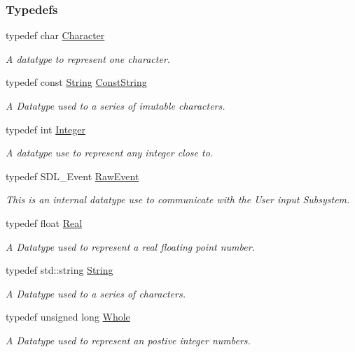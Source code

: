 \subsubsection*{Typedefs}
\begin{DoxyCompactItemize}
\item 
typedef char \hyperlink{namespacephys_a3098bae5b0a3cd16eec331f766cc562b}{Character}
\begin{DoxyCompactList}\small\item\em A datatype to represent one character. \item\end{DoxyCompactList}\item 
typedef const \hyperlink{namespacephys_aa03900411993de7fbfec4789bc1d392e}{String} \hyperlink{namespacephys_a5ce5049f8b4bf88d6413c47b504ebb31}{ConstString}
\begin{DoxyCompactList}\small\item\em A Datatype used to a series of imutable characters. \item\end{DoxyCompactList}\item 
typedef int \hyperlink{namespacephys_a7f09bf5585b2bb97613cd9aad4273a81}{Integer}
\begin{DoxyCompactList}\small\item\em A datatype use to represent any integer close to. \item\end{DoxyCompactList}\item 
typedef SDL\_\-Event \hyperlink{namespacephys_a8126d26e4507e66d09876988bb941fd4}{RawEvent}
\begin{DoxyCompactList}\small\item\em This is an internal datatype use to communicate with the User input Subsystem. \item\end{DoxyCompactList}\item 
typedef float \hyperlink{namespacephys_af7eb897198d265b8e868f45240230d5f}{Real}
\begin{DoxyCompactList}\small\item\em A Datatype used to represent a real floating point number. \item\end{DoxyCompactList}\item 
typedef std::string \hyperlink{namespacephys_aa03900411993de7fbfec4789bc1d392e}{String}
\begin{DoxyCompactList}\small\item\em A Datatype used to a series of characters. \item\end{DoxyCompactList}\item 
typedef unsigned long \hyperlink{namespacephys_a460f6bc24c8dd347b05e0366ae34f34a}{Whole}
\begin{DoxyCompactList}\small\item\em A Datatype used to represent an postive integer numbers. \item\end{DoxyCompactList}\end{DoxyCompactItemize}
